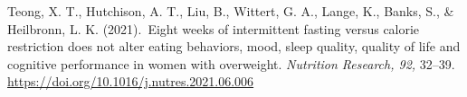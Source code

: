 \documentclass[authordate, empirical]{jote-new-article}
\begin{document}









Teong, X. T., Hutchison, A. T., Liu, B., Wittert, G. A., Lange, K., Banks, S., \& Heilbronn, L. K. (2021). Eight weeks of intermittent fasting versus calorie restriction does not alter eating behaviors, mood, sleep quality, quality of life and cognitive performance in women with overweight. \emph{Nutrition Research, 92, }32--39. \url{https://doi.org/10.1016/j.nutres.2021.06.006}









\end{document}
